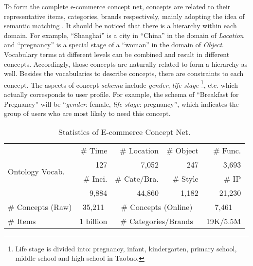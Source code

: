 To form the complete e-commerce concept net,
concepts are related to their representative items, 
categories, brands respectively, mainly adopting the idea of semantic matching \cite{huang2013learning, shen2014learning}.
It should be noticed that there is a hierarchy within each domain. For example, ``Shanghai'' is a city in ``China'' in the domain of \textit{Location} and ``pregnancy'' is a special stage of a ``woman'' in the domain of \textit{Object}.  Vocabulary terms at different levels can be combined and result in different concepts.
Accordingly, those concepts are naturally related to form a hierarchy as well.
Besides the vocabularies to describe concepts, there are constraints to each concept. 
The aspects of concept \textit{schema} include
 \textit{gender}, \textit{life stage} \footnote{Life stage is divided into: pregnancy, infant, kindergarten, primary school, middle school and high school in Taobao.}, etc.
which actually corresponds to user profile.
For example, the schema of ``Breakfast for Pregnancy'' will be ``\textit{gender}: female, \textit{life stage}: pregnancy'', which indicates the group of users who are most likely to need this concept.

\begin{table}[th]
	\centering
	\small
	\begin{tabular}{|l|r|r|r|r|}
		\hline
		\multirow{4}{*}{Ontology Vocab.} 
		&\# Time &\# Location &\# Object &\# Func.  \\
		\cline{2-5}
		& 127 & 7,052 & 247 & 3,693 \\
		\cline{2-5}
		&\# Inci. & \# Cate/Bra. & \# Style &\# IP  \\
		\cline{2-5}
		& 9,884 & 44,860 & 1,182 & 21,230 \\
		\hline
		\# Concepts (Raw) & \multicolumn{1}{c|}{35,211} &
		\multicolumn{2}{c|}{\# Concepts (Online)} & \multicolumn{1}{c|}{7,461} \\ 
		\hline
		\# Items & \multicolumn{1}{c|}{1 billion} &
		\multicolumn{2}{c|}{\# Categories/Brands} & \multicolumn{1}{c|}{19K/5.5M} \\ 
		\hline
	\end{tabular}
	\caption{Statistics of E-commerce Concept Net.}
	\label{tab:data}
\end{table}


